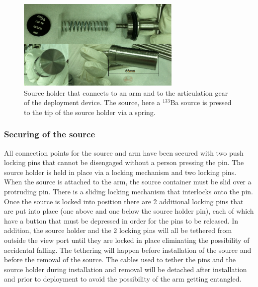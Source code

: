 \begin{figure}[htbp]
 \centering
  \includegraphics[width=0.7\textwidth]{Figures/SourceHolder.png}
  \caption{Source holder that connects to an arm and to the articulation gear of the deployment device. The source, here a $^{133}$Ba source is pressed to the tip of the source holder via a spring.}
  \label{fig:SourceHolder}
\end{figure}


\subsubsection{Securing of the source}
All connection points for the source and arm have been secured with two push locking pins that cannot be disengaged without a person pressing the pin. 
The source holder is held in place via a locking mechanism and two locking pins. When the source is attached to the arm, the source container must be slid over a protruding pin. There is a sliding locking mechanism that interlocks onto the pin. Once the source is locked into position there are 2 additional locking pins that are put into place (one above and one below the source holder pin), each of which have a button that must be depressed in order for the pins to be released. In addition, the source holder and the 2 locking pins will all be tethered from outside the view port until they are locked in place eliminating the possibility of accidental falling.  The tethering will happen before installation of the source and before the removal of the source. The cables used to tether the pins and the source holder during installation and removal will be detached after installation and prior to deployment to avoid the possibility of the arm getting entangled.  
 

